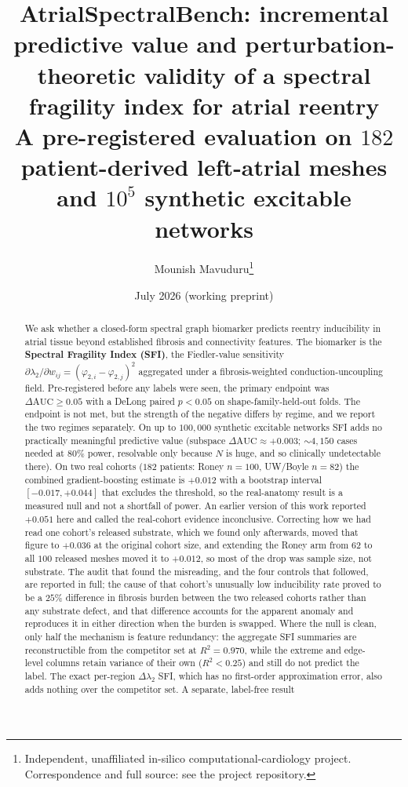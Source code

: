 \documentclass[11pt]{article}
\title{\textbf{AtrialSpectralBench}: incremental predictive value and
perturbation-theoretic validity of a spectral fragility index for atrial
reentry\\[4pt]
\large A pre-registered evaluation on $182$ patient-derived left-atrial meshes
and $10^{5}$ synthetic excitable networks}
\author{Mounish Mavuduru\thanks{Independent, unaffiliated in-silico
computational-cardiology project. Correspondence and full source: see the
project repository.}}
\date{July 2026 (working preprint)}
\theoremstyle{definition}
\newcommand{\lam}{\lambda}
\newcommand{\phii}{\varphi}
\newcommand{\dAUC}{\Delta\mathrm{AUC}}
\begin{document}
\maketitle

\begin{abstract}
\noindent
We ask whether a closed-form spectral graph biomarker predicts reentry
inducibility in atrial tissue beyond established fibrosis and connectivity
features. The biomarker is the \textbf{Spectral Fragility Index (SFI)}, the
Fiedler-value sensitivity $\partial\lam_2/\partial w_{ij}=(\phii_{2,i}-\phii_{2,j})^2$
aggregated under a fibrosis-weighted conduction-uncoupling field. Pre-registered
before any labels were seen, the primary endpoint was $\dAUC\geq 0.05$ with a
DeLong paired $p<0.05$ on shape-family-held-out folds. The endpoint is not met,
but the strength of the negative differs by regime, and we report the two
regimes separately. On up to $100{,}000$ synthetic excitable networks SFI adds
no practically meaningful predictive value (subspace $\dAUC\approx+0.003$;
$\sim\!4{,}150$ cases needed at $80\%$ power, resolvable only because $N$ is
huge, and so clinically undetectable there). On two real cohorts ($182$
patients: Roney $n=100$, UW/Boyle $n=82$) the combined gradient-boosting
estimate is $+0.012$ with a bootstrap interval $[-0.017,+0.044]$ that excludes
the threshold, so the real-anatomy result is a measured null and not a
shortfall of power. An earlier version of this work reported $+0.051$ here and
called the real-cohort evidence inconclusive. Correcting how we had read one
cohort's released substrate, which we found only afterwards, moved that figure
to $+0.036$ at the original cohort size, and extending the Roney arm from $62$
to all $100$ released meshes moved it to $+0.012$, so most of the drop was
sample size, not substrate. The audit that found the misreading, and the four
controls that followed, are reported in full; the cause of that cohort's
unusually low inducibility rate proved to be a $25\%$ difference in fibrosis
burden between the two released cohorts rather than any substrate defect, and
that difference accounts for the apparent anomaly and reproduces it in either
direction when the burden is swapped. Where the null is clean, only half the
mechanism is feature redundancy: the aggregate SFI summaries are reconstructible
from the competitor set at $R^2=0.970$, while the extreme and edge-level columns
retain variance of their own ($R^2<0.25$) and still do not predict the label.
The exact per-region $\Delta\lam_2$ SFI, which has no first-order approximation
error, also adds nothing over the competitor set. A separate, label-free result

\end{abstract}
\end{document}
